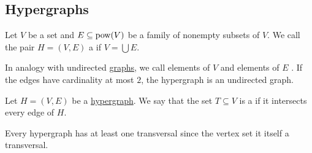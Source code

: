 \subsection{Hypergraphs}\label{subsec:hypergraphs}

\begin{definition}\label{def:hypergraph}\cite[30]{Gondran1984}
  Let \( V \) be a set and \( E \subseteq \operatorname{pow}(V) \) be a family of nonempty subsets of \( V \). We call the pair \( H = (V, E) \) a  if \( V = \bigcup E \).

  In analogy with undirected \hyperref[def:undirected_graph]{graphs}, we call elements of \( V \)  and elements of \( E \) . If the edges have cardinality at most \( 2 \), the hypergraph is an undirected graph.
\end{definition}

\begin{definition}\label{def:hypergraph_transversal}\cite[32]{Gondran1984}
  Let \( H = (V, E) \) be a \hyperref[def:hypergraph]{hypergraph}. We say that the set \( T \subseteq V \) is a  if it intersects every edge of \( H \).
\end{definition}

\begin{example}\label{ex:trivial_hypergraph_transversal}
  Every hypergraph has at least one transversal since the vertex set it itself a transversal.
\end{example}

